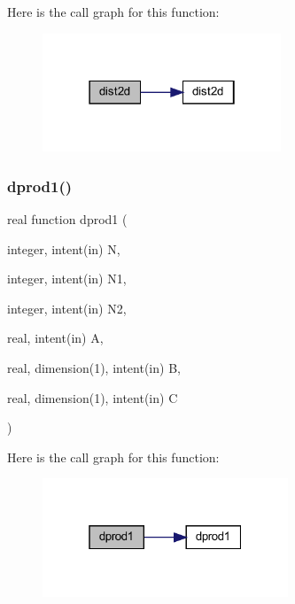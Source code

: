Here is the call graph for this function\+:\nopagebreak
\begin{figure}[H]
\begin{center}
\leavevmode
\includegraphics[width=202pt]{Leroi__c_8f90_a173fbca69518ee77703afb9c67d3e4f0_cgraph}
\end{center}
\end{figure}
\mbox{\label{Leroi__c_8f90_a728fa0fc652b63cee1eb0d408bbac553}} 
\subsubsection{\texorpdfstring{dprod1()}{dprod1()}}
{\footnotesize\ttfamily real function dprod1 (\begin{DoxyParamCaption}\item[{integer, intent(in)}]{N,  }\item[{integer, intent(in)}]{N1,  }\item[{integer, intent(in)}]{N2,  }\item[{real, intent(in)}]{A,  }\item[{real, dimension(1), intent(in)}]{B,  }\item[{real, dimension(1), intent(in)}]{C }\end{DoxyParamCaption})}

Here is the call graph for this function\+:\nopagebreak
\begin{figure}[H]
\begin{center}
\leavevmode
\includegraphics[width=208pt]{Leroi__c_8f90_a728fa0fc652b63cee1eb0d408bbac553_cgraph}
\end{center}
\end{figure}
\mbox{\label{Leroi__c_8f90_a0dd58336077baa8c233cc4d08cc10939}} 
